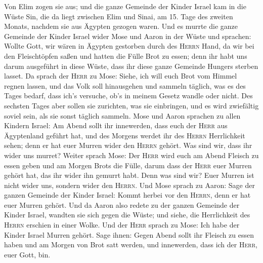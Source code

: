  Von Elim zogen sie aus; und die ganze Gemeinde der Kinder
Israel kam in die Wüste Sin, die da liegt zwischen Elim und Sinai, am
15. Tage des zweiten Monats, nachdem sie aus Ägypten gezogen waren.
 Und es murrte die ganze Gemeinde der Kinder Israel wider
Mose und Aaron in der Wüste  und sprachen: Wollte Gott,
wir wären in Ägypten gestorben durch des \textsc{Herrn} Hand, da wir bei
den Fleischtöpfen saßen und hatten die Fülle Brot zu essen; denn ihr
habt uns darum ausgeführt in diese Wüste, dass ihr diese ganze Gemeinde
Hungers sterben lasset.  Da sprach der \textsc{Herr} zu
Mose: Siehe, ich will euch Brot vom Himmel regnen lassen, und das Volk
soll hinausgehen und sammeln täglich, was es des Tages bedarf, dass
ich's versuche, ob's in meinem Gesetz wandle oder nicht. 
Des sechsten Tages aber sollen sie zurichten, was sie einbringen, und es
wird zwiefältig soviel sein, als sie sonst täglich sammeln.
 Mose und Aaron sprachen zu allen Kindern Israel: Am Abend
sollt ihr innewerden, dass euch der \textsc{Herr} aus Ägyptenland
geführt hat,  und des Morgens werdet ihr des
\textsc{Herrn} Herrlichkeit sehen; denn er hat euer Murren wider den
\textsc{Herrn} gehört. Was sind wir, dass ihr wider uns murret?
 Weiter sprach Mose: Der \textsc{Herr} wird euch am Abend
Fleisch zu essen geben und am Morgen Brots die Fülle, darum dass der
\textsc{Herr} euer Murren gehört hat, das ihr wider ihn gemurrt habt.
Denn was sind wir? Euer Murren ist nicht wider uns, sondern wider den
\textsc{Herrn}.  Und Mose sprach zu Aaron: Sage der ganzen
Gemeinde der Kinder Israel: Kommt herbei vor den \textsc{Herrn}, denn er
hat euer Murren gehört.  Und da Aaron also redete zu der
ganzen Gemeinde der Kinder Israel, wandten sie sich gegen die Wüste; und
siehe, die Herrlichkeit des \textsc{Herrn} erschien in einer Wolke.
 Und der \textsc{Herr} sprach zu Mose: 
Ich habe der Kinder Israel Murren gehört. Sage ihnen: Gegen Abend sollt
ihr Fleisch zu essen haben und am Morgen von Brot satt werden, und
innewerden, dass ich der \textsc{Herr}, euer Gott, bin.


